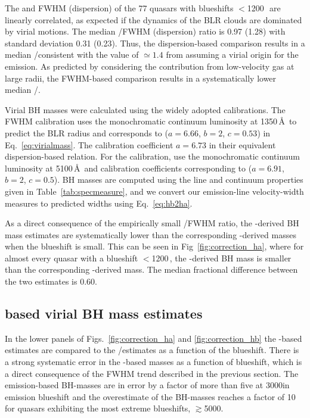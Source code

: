 The \ha and  FWHM (dispersion) of the 77 quasars with  blueshifts $<$1200\,\kms\, are linearly correlated, as expected if the dynamics of the BLR clouds are dominated by virial motions. 
The median /\ha FWHM (dispersion) ratio is 0.97 (1.28) with standard deviation 0.31 (0.23). 
Thus, the dispersion-based comparison results in a median /\ha consistent with the value of $\simeq1.4$ from assuming a virial origin for the emission. 
As predicted by considering the contribution from low-velocity gas at large radii, the FWHM-based comparison results in a systematically lower median /\hans.

Virial BH masses were calculated using the widely adopted \citet{vestergaard06} calibrations. 
The \citet{vestergaard06}  FWHM calibration uses the monochromatic continuum luminosity at 1350\,\AA\, to predict the BLR radius and corresponds to ($a=6.66$, $b=2$, $c=0.53$) in Eq.~\ref{eq:virialmass}. 
The calibration coefficient $a=6.73$ in their equivalent dispersion-based relation. 
For the \hb calibration, \citet{vestergaard06} use the monochromatic continuum luminosity at 5100\,\AA\, and calibration coefficients corresponding to ($a=6.91$, $b=2$, $c=0.5$).
BH masses are computed using the line and continuum properties given in Table~\ref{tab:specmeasure}, and we convert our \ha emission-line velocity-width measures to predicted \hb widths using Eq.~\ref{eq:hb2ha}.

As a direct consequence of the empirically small /\ha FWHM ratio, the -derived BH mass estimates are systematically lower than the corresponding \hans-derived masses when the blueshift is small.
This can be seen in Fig~\ref{fig:correction_ha}, where for almost every quasar with a  blueshift $<$1200\,\kms, the -derived BH mass is smaller than the corresponding \hans-derived mass.
The median fractional difference between the two estimates is 0.60.  

\subsection{ based virial BH mass estimates}

In the lower panels of Figs.~\ref{fig:correction_ha} and \ref{fig:correction_hb} the -based estimates are compared to the \hans/\hb estimates as a function of the  blueshift. 
There is a strong systematic error in the -based masses as a function of blueshift, which is a direct consequence of the FWHM trend described in the previous section. 
The  emission-based BH-masses are in error by a factor of more than five at 3000\kms in  emission blueshift and the overestimate of the BH-masses reaches a factor of 10 for quasars exhibiting the most extreme blueshifts, $\gtrsim$5000\kms. 

